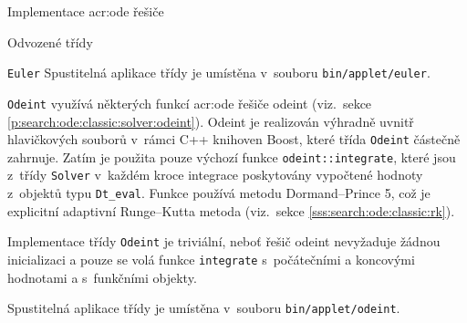 \documentclass[thesis=M,czech]{FITthesis}[2012/06/26]
\newcommand{\acrlabel}[1]{acr:#1}
\newcommand{\acr}[1]{\acrshort{\acrlabel{#1}}}
\newcommand{\id}[1]{\texttt{#1}}
\newcommand{\rf}[1]{\ref{#1}}
\newcommand{\binDir}{\id{bin}}
\newcommand{\appletDir}{\id{\binDir{}/\-applet}}
\newcommand{\appletFn}[1]{\id{\appletDir{}/\-#1}}
\begin{document}
\begin{section}{Implementace \acr{ode} řešiče}
\begin{subsection}{Odvozené třídy}
\begin{paragraph}{\id{Euler}}
Spustitelná aplikace třídy je umístěna v~souboru \appletFn{euler}.
\end{paragraph} %


\begin{paragraph}{\id{Odeint}}
\label{p:impl:ode:derived:odeint}
využívá některých funkcí \acr{ode} řešiče odeint
(viz.~sekce \rf{p:search:ode:classic:solver:odeint}).
Odeint je realizován výhradně uvnitř hlavičkových souborů
v~rámci C++ knihoven Boost,
které třída \id{Odeint} částečně zahrnuje.
Zatím je použita pouze výchozí funkce
\id{odeint::\-integrate},
které jsou z~třídy \id{Solver}
v~každém kroce integrace poskytovány vypočtené
hodnoty z~objektů typu \id{Dt\_\-eval}.
Funkce používá metodu Dormand--Prince 5,
což je explicitní adaptivní Runge--Kutta metoda
(viz.~sekce \rf{sss:search:ode:classic:rk}).

Implementace třídy \id{Odeint} je triviální,
neboť řešič odeint nevyžaduje žádnou
inicializaci a pouze se volá funkce \id{integrate}
s~počátečními a koncovými hodnotami
a s~funkčními objekty.

Spustitelná aplikace třídy je umístěna v~souboru \appletFn{odeint}.
\end{paragraph} %


\end{subsection} %


\end{section} %

\end{document}
